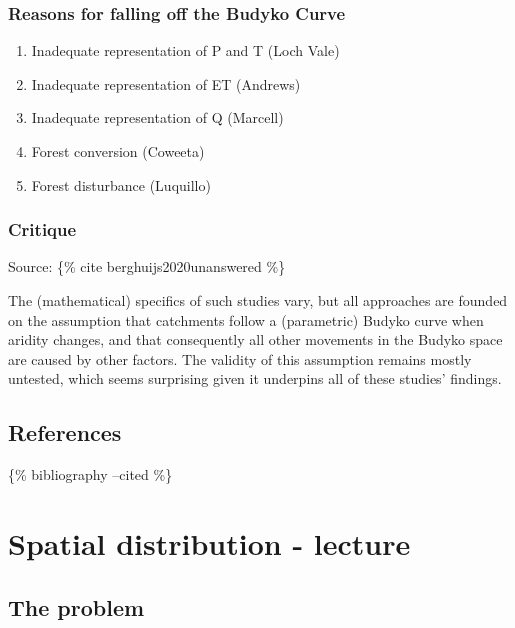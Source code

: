 \documentclass[
  letterpaper,
  DIV=11,
  numbers=noendperiod]{scrreprt}
\providecommand{\tightlist}{%
  \setlength{\itemsep}{0pt}\setlength{\parskip}{0pt}}\usepackage{longtable,booktabs,array}
\begin{document}
\hypertarget{reasons-for-falling-off-the-budyko-curve}{%
\subsection{Reasons for falling off the Budyko
Curve}\label{reasons-for-falling-off-the-budyko-curve}}

\begin{enumerate}
\def\labelenumi{\arabic{enumi}.}
\tightlist
\item
  Inadequate representation of P and T (Loch Vale)
\item
  Inadequate representation of ET (Andrews)
\item
  Inadequate representation of Q (Marcell)
\item
  Forest conversion (Coweeta)
\item
  Forest disturbance (Luquillo)
\end{enumerate}

\hypertarget{critique}{%
\subsection{Critique}\label{critique}}

Source: \{\% cite berghuijs2020unanswered \%\}

The (mathematical) specifics of such studies vary, but all approaches
are founded on the assumption that catchments follow a (parametric)
Budyko curve when aridity changes, and that consequently all other
movements in the Budyko space are caused by other factors. The validity
of this assumption remains mostly untested, which seems surprising given
it underpins all of these studies' findings.

\hypertarget{references}{%
\section{References}\label{references}}

\{\% bibliography --cited \%\}

\hypertarget{spatial-distribution---lecture}{%
\chapter{Spatial distribution -
lecture}\label{spatial-distribution---lecture}}

\hypertarget{the-problem}{%
\section{The problem}\label{the-problem}}
\end{document}
